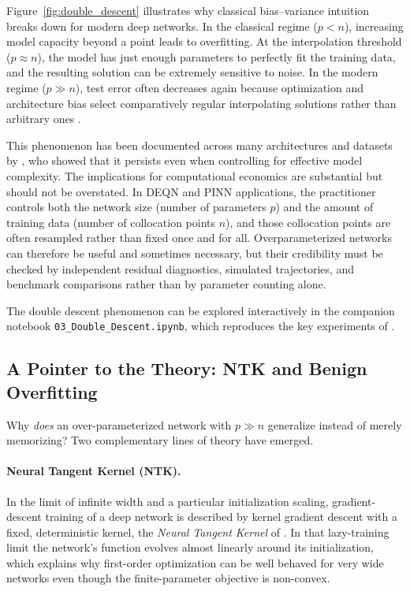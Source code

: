 \documentclass[11pt,a4paper]{report}
\begin{document}
Figure~\ref{fig:double_descent} illustrates why classical bias--variance intuition breaks down for modern deep networks.  In the classical regime ($p < n$), increasing model capacity beyond a point leads to overfitting.  At the interpolation threshold ($p \approx n$), the model has just enough parameters to perfectly fit the training data, and the resulting solution can be extremely sensitive to noise.  In the modern regime ($p \gg n$), test error often decreases again because optimization and architecture bias select comparatively regular interpolating solutions rather than arbitrary ones \citep{belkin2019reconciling}.

This phenomenon has been documented across many architectures and datasets by \citet{nakkiran2020deep}, who showed that it persists even when controlling for effective model complexity.  The implications for computational economics are substantial but should not be overstated.  In DEQN and PINN applications, the practitioner controls both the network size (number of parameters $p$) and the amount of training data (number of collocation points $n$), and those collocation points are often resampled rather than fixed once and for all.  Overparameterized networks can therefore be useful and sometimes necessary, but their credibility must be checked by independent residual diagnostics, simulated trajectories, and benchmark comparisons rather than by parameter counting alone.

The double descent phenomenon can be explored interactively in the companion notebook \texttt{03\_Double\_Descent.ipynb}, which reproduces the key experiments of \citet{nakkiran2020deep}.

\subsection{A Pointer to the Theory: NTK and Benign Overfitting}
\label{sec:ntk_pointer}

Why \emph{does} an over-parameterized network with $p \gg n$ generalize instead of merely memorizing?  Two complementary lines of theory have emerged.

\paragraph{Neural Tangent Kernel (NTK).}  In the limit of infinite width and a particular initialization scaling, gradient-descent training of a deep network is described by kernel gradient descent with a fixed, deterministic kernel, the \emph{Neural Tangent Kernel} of \citet{jacot2018neural}.  In that lazy-training limit the network's function evolves almost linearly around its initialization, which explains why first-order optimization can be well behaved for very wide networks even though the finite-parameter objective is non-convex.
\end{document}
